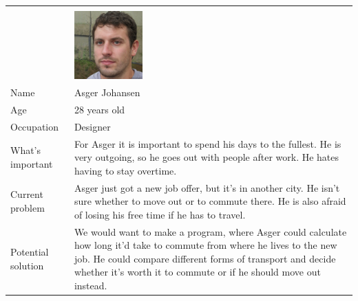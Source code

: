 \noindent
\begin{tabularx}{\textwidth}{ | l X | }
    \hline
    &                                                      \\
    & \includegraphics[width=0.25\textwidth]{images/asger} \\
    Name       & Asger Johansen                                       \\
    Age        & 28 years old                                         \\
    Occupation & Designer                                             \\
    What's important & For Asger it is important to spend his days to the fullest.
    He is very outgoing, so he goes out with people after work.
    He hates having to stay overtime. \\
    Current problem & Asger just got a new job offer, but it's in another city.
    He isn't sure whether to move out or to commute there.
    He is also afraid of losing his free time if he has to travel. \\
    Potential solution & We would want to make a program, where Asger could calculate how long it'd take to commute from
    where he lives to the new job.
    He could compare different forms of transport and decide whether it's worth it to commute or if he should move out
    instead. \\
    \hline
\end{tabularx}

